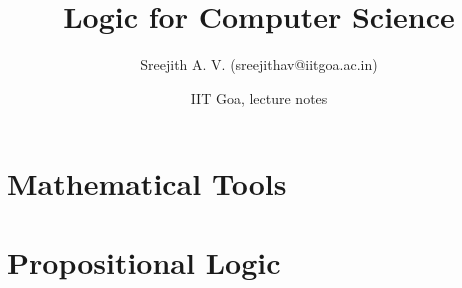 \documentclass[12pt,
    driverfallback=dvipdfm,
 	openany,
    a4paper,
    toc=bibliography,
    twoside,
    numbers=noenddot]{book}              %
\title{\bf Logic for Computer Science}    %
\author{Sreejith A. V. (sreejithav@iitgoa.ac.in)}              %
\date{IIT Goa, lecture notes}                           %
\begin{document}
\frontmatter                            %
\maketitle                              %
\tableofcontents                        %
\mainmatter                             %

\part{Mathematical Tools}


\part{Propositional Logic}




\end{document}
